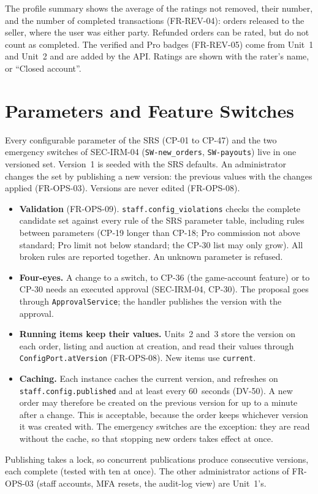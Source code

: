 \documentclass[11pt,a4paper]{article}
\begin{document}
The profile summary shows the average of the ratings not removed, their number, and the number of completed transactions (FR-REV-04): orders released to the seller, where the user was either party. Refunded orders can be rated, but do not count as completed. The verified and Pro badges (FR-REV-05) come from Unit~1 and Unit~2 and are added by the API. Ratings are shown with the rater's name, or ``Closed account''.

\section{Parameters and Feature Switches}
\label{sec:config}
Every configurable parameter of the SRS (CP-01 to CP-47) and the two emergency switches of SEC-IRM-04 (\texttt{SW-new\_orders}, \texttt{SW-payouts}) live in one versioned set. Version~1 is seeded with the SRS defaults. An administrator changes the set by publishing a new version: the previous values with the changes applied (FR-OPS-03). Versions are never edited (FR-OPS-08).
\begin{itemize}[nosep]
  \item \textbf{Validation} (FR-OPS-09). \texttt{staff.config\_violations} checks the complete candidate set against every rule of the SRS parameter table, including rules between parameters (CP-19 longer than CP-18; Pro commission not above standard; Pro limit not below standard; the CP-30 list may only grow). All broken rules are reported together. An unknown parameter is refused.
  \item \textbf{Four-eyes.} A change to a switch, to CP-36 (the game-account feature) or to CP-30 needs an executed approval (SEC-IRM-04, CP-30). The proposal goes through \texttt{ApprovalService}; the handler publishes the version with the approval.
  \item \textbf{Running items keep their values.} Units~2 and~3 store the version on each order, listing and auction at creation, and read their values through \texttt{ConfigPort.atVersion} (FR-OPS-08). New items use \texttt{current}.
  \item \textbf{Caching.} Each instance caches the current version, and refreshes on \texttt{staff.\allowbreak config.\allowbreak published} and at least every 60~seconds (DV-50). A new order may therefore be created on the previous version for up to a minute after a change. This is acceptable, because the order keeps whichever version it was created with. The emergency switches are the exception: they are read without the cache, so that stopping new orders takes effect at once.
\end{itemize}
Publishing takes a lock, so concurrent publications produce consecutive versions, each complete (tested with ten at once). The other administrator actions of FR-OPS-03 (staff accounts, MFA resets, the audit-log view) are Unit~1's.
\end{document}
